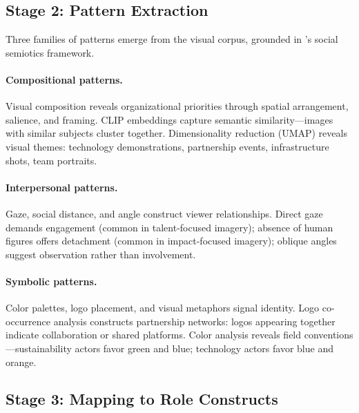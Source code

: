\documentclass[../main.tex]{subfiles}
\begin{document}
\subsection{Stage 2: Pattern Extraction}

Three families of patterns emerge from the visual corpus,
grounded in \textcite{kress2006reading}'s social semiotics framework.

\paragraph{Compositional patterns.}
Visual composition reveals organizational priorities through
spatial arrangement, salience, and framing.
CLIP embeddings capture semantic similarity---images with similar
subjects cluster together.
Dimensionality reduction (UMAP) reveals visual themes:
technology demonstrations, partnership events, infrastructure shots,
team portraits.

\paragraph{Interpersonal patterns.}
Gaze, social distance, and angle construct viewer relationships.
Direct gaze demands engagement (common in talent-focused imagery);
absence of human figures offers detachment (common in impact-focused imagery);
oblique angles suggest observation rather than involvement.

\paragraph{Symbolic patterns.}
Color palettes, logo placement, and visual metaphors signal identity.
Logo co-occurrence analysis constructs partnership networks:
logos appearing together indicate collaboration or shared platforms.
Color analysis reveals field conventions---sustainability actors favor
green and blue; technology actors favor blue and orange.

\subsection{Stage 3: Mapping to Role Constructs}
\end{document}
